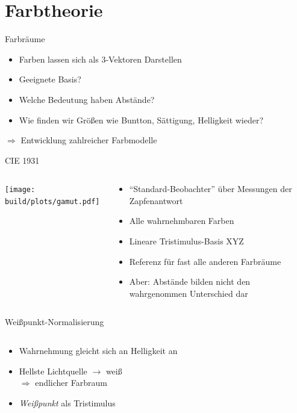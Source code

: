 \documentclass[aspectratio=1610, 9pt]{beamer}
\begin{document}
\section{Farbtheorie}

\begin{frame}{Farbräume}
  \begin{itemize}
    \item Farben lassen sich als 3-Vektoren Darstellen
    \item Geeignete Basis?
    \item Welche Bedeutung haben Abstände?
    \item Wie finden wir Größen wie Buntton, Sättigung, Helligkeit wieder?
  \end{itemize}

  \Large $⇒{}$ Entwicklung zahlreicher Farbmodelle
\end{frame}%

\begin{frame}{CIE 1931}
  \begin{columns}[onlytextwidth]%
    \begin{column}{0.495\textwidth}%
      \texttt{[image: build/plots/gamut.pdf]}
    \end{column}%
    \begin{column}{0.495\textwidth}%
      \begin{itemize}
        \item \enquote{Standard-Beobachter} über Messungen der Zapfenantwort
        \item Alle wahrnehmbaren Farben
        \item Lineare Tristimulus-Basis XYZ
        \item Referenz für fast alle anderen Farbräume
        \item Aber: Abstände bilden nicht den wahrgenommen Unterschied dar
      \end{itemize}
    \end{column}%
  \end{columns}%
\end{frame}

\begin{frame}{Weißpunkt-Normalisierung}
  \begin{columns}[onlytextwidth]%
    \begin{column}{0.4\textwidth}%
      \begin{itemize}
        \item Wahrnehmung gleicht sich an Helligkeit an
        \item Hellste Lichtquelle ${}→{}$ weiß \\
          $⇒{}$ endlicher Farbraum
        \item \emph{Weißpunkt} als Tristimulus
      \end{itemize}
    \end{column}%
    \begin{column}{0.595\textwidth}%
    \end{column}%
  \end{columns}%
\end{frame}
\end{document}
